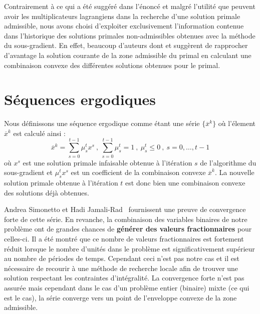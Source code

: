 \vspace*{1.2cm}

Contrairement à ce qui a été suggéré dans l'énoncé et malgré l'utilité que peuvent avoir les multiplicateurs lagrangiens
dans la recherche d'une solution primale admissible, nous avons choisi d'exploiter exclusivement l'information
contenue dans l'historique des solutions primales non-admissibles obtenues avec la méthode du sous-gradient.
En effet, beaucoup d'auteurs dont \citep{doi:10.1137/S1052623498332336} et \citep{Zhuang1988}
suggèrent de rapprocher d'avantage la solution courante de la zone admissible du primal en calculant une combinaison
convexe des différentes solutions obtenues pour le primal.

\section{Séquences ergodiques}

Nous définissons une séquence ergodique comme étant une série $\{\overline{x}^k\}$ où l'élement $\overline{x}^k$
est calculé ainsi \citep{Aldenvik}:
\begin{equation}
    \overline{x}^k = \sum\limits_{s=0}^{t-1} \mu_s^t x^s \ , \ \sum\limits_{s=0}^{t-1} \mu_s^t = 1 \ , \ \mu_s^t \le 0 \ , \ s = 0, \ldots, t-1
\end{equation}
où $x^s$ est une solution primale infaisable obtenue à l'itération $s$ de l'algorithme du sous-gradient et $\mu_s^t x^s$ est un coefficient
de la combinaison convexe $\overline{x}^k$. La nouvelle solution primale obtenue à l'itération $t$ est donc bien une combinaison convexe 
des solutions déjà obtenues.

Andrea Simonetto et Hadi Jamali-Rad~\citep{Simonetto2016} fournissent une preuve de convergence forte de cette série.
En revanche, la combinaison des variables binaires de notre problème ont de grandes chances de \textbf{générer des valeurs fractionnaires} pour
celles-ci. Il a été montré que ce nombre de valeurs fractionnaires est fortement réduit lorsque le nombre d'unités dans le problème
est significativement supérieur au nombre de périodes de temps. Cependant ceci n'est pas notre cas et il est nécessaire de recourir à une 
méthode de recherche locale afin de trouver une solution respectant les contraintes d'intégralité.
La convergence forte n'est pas assurée mais cependant dans le cas d'un problème entier (binaire) mixte (ce qui est le cas), la série converge vers 
un point de l'enveloppe convexe de la zone admissible.

